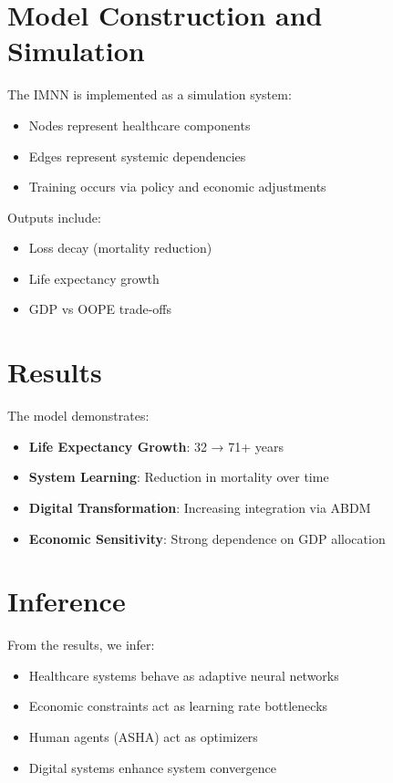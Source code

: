 \documentclass[12pt]{article}
\begin{document}
\section{Model Construction and Simulation}

The IMNN is implemented as a simulation system:

\begin{itemize}
\item Nodes represent healthcare components
\item Edges represent systemic dependencies
\item Training occurs via policy and economic adjustments
\end{itemize}

Outputs include:

\begin{itemize}
\item Loss decay (mortality reduction)
\item Life expectancy growth
\item GDP vs OOPE trade-offs
\end{itemize}

\section{Results}

The model demonstrates:

\begin{itemize}
\item \textbf{Life Expectancy Growth}: 32 → 71+ years
\item \textbf{System Learning}: Reduction in mortality over time
\item \textbf{Digital Transformation}: Increasing integration via ABDM
\item \textbf{Economic Sensitivity}: Strong dependence on GDP allocation
\end{itemize}

\section{Inference}

From the results, we infer:

\begin{itemize}
\item Healthcare systems behave as adaptive neural networks
\item Economic constraints act as learning rate bottlenecks
\item Human agents (ASHA) act as optimizers
\item Digital systems enhance system convergence
\end{itemize}
\end{document}
